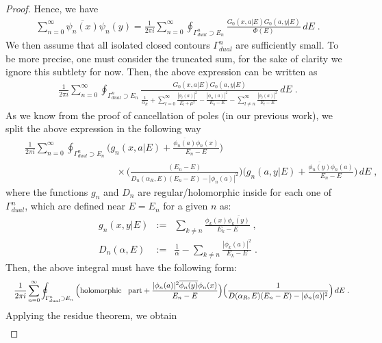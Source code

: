 \documentclass[amsmath,amssymb,14pt]{article}
\numberwithin{equation}{section}
\begin{document}
\begin{proof}
%
Hence, we have
%
\begin{eqnarray}
   \sum_{n=0}^{\infty} \overline{\psi_n(x)} \psi_n (y) =   \frac{1}{2\pi i} \sum_{n=0}^{\infty} \oint_{\Gamma_{dual}^{n} \supset E_{n}} \frac{G_0(x,a|E) G_0(a,y|E)}{\Phi(E)}  \, dE \;.
\end{eqnarray}
%
We then assume that all isolated closed contours $\Gamma_{dual}^{n}$ are sufficiently small. To be more precise, one must consider the truncated sum, for the sake of clarity we ignore this subtlety for now. Then, the above expression can be written as
%
\begin{eqnarray}
     \frac{1}{2\pi i} \sum_{n=0}^{\infty} \oint_{\Gamma_{dual}^{n} \supset E_{n}} \frac{G_0(x,a|E) G_0(a,y|E)}{\frac{1}{\alpha_R} + \sum_{l=0}^{\infty} \frac{|\phi_l(a)|^2}{E_l+\mu^2} -\frac{|\phi_n(a)|^2}{E_n -E}-\sum_{l \neq n}^{\infty} \frac{|\phi_l(a)|^2}{E_l-E} }\, dE \;.
\end{eqnarray}
%
As we know from the proof of cancellation of poles (in our previous work), we split the above expression in the following way 
%
\begin{eqnarray*}
   & &   \frac{1}{2\pi i} \sum_{n=0}^{\infty} \oint_{\Gamma_{dual}^{n} \supset E_{n}} \Big( g_n(x,a|E) + \frac{\overline{\phi_n(a)} \phi_n(x)}{E_n-E}\Big) \\
  & & \hspace{4cm} \times   \Big( \frac{(E_n-E)}{D_n(\alpha_R,E)(E_n-E)-|\phi_n(a)|^2}\Big) \Big(g_n(a,y|E) + \frac{\overline{\phi_n(y)} \phi_n(a)}{E_n-E}\Big) \, dE \;,
\end{eqnarray*}
%
where the functions $g_n$ and $D_n$ are regular/holomorphic inside for each one of $\Gamma_{dual}^n$, 
which are defined near $E=E_n$ for a given  $n$ as:
%
\begin{eqnarray}
    g_n(x,y|E) & := & \sum_{ k\neq n} \frac{\phi_k(x) \overline{\phi_k(y)}}{E_k-E} \;, \\
    D_n(\alpha, E) & := & \frac{1}{\alpha}-\sum_{k \neq n} \frac{|\phi_k(a)|^2}{E_k-E}  \;.
\end{eqnarray}
%
Then, the above integral must have the following form:
%
\begin{eqnarray*}
   & &   \frac{1}{2\pi i} \sum_{n=0}^{\infty} \oint_{\Gamma_{dual}^{n} \supset E_{n}} \Big( \text{holomorphic \, part} + \frac{|\phi_n(a)|^2 \overline{\phi_n(y)} \phi_n(x)}{E_n-E}\Big)  \Big( \frac{1}{D(\alpha_R,E)(E_n-E)-|\phi_n(a)|^2}\Big) \, dE \;.
\end{eqnarray*}
%
Applying the residue theorem, we obtain 
%
\begin{eqnarray}

\end{eqnarray}
\end{proof}
\end{document}
